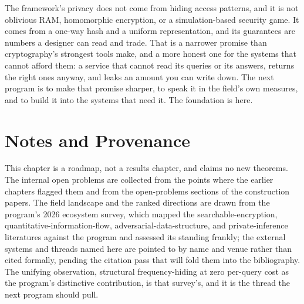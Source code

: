 The framework's privacy does not come from hiding access patterns, and it is
not oblivious RAM, homomorphic encryption, or a simulation-based security
game. It comes from a one-way hash and a uniform representation, and its
guarantees are numbers a designer can read and trade. That is a narrower
promise than cryptography's strongest tools make, and a more honest one for
the systems that cannot afford them: a service that cannot read its queries
or its answers, returns the right ones anyway, and leaks an amount you can
write down. The next program is to make that promise sharper, to speak it in
the field's own measures, and to build it into the systems that need it. The
foundation is here.

\section{Notes and Provenance}
\label{sec:ch14-notes}

This chapter is a roadmap, not a results chapter, and claims no new theorems.
The internal open problems are collected from the points where the earlier
chapters flagged them and from the open-problems sections of the construction
papers. The field landscape and the ranked directions are drawn from the
program's 2026 ecosystem survey, which mapped the searchable-encryption,
quantitative-information-flow, adversarial-data-structure, and
private-inference literatures against the program and assessed its standing
frankly; the external systems and threads named here are pointed to by name
and venue rather than cited formally, pending the citation pass that will
fold them into the bibliography. The unifying observation, structural
frequency-hiding at zero per-query cost as the program's distinctive
contribution, is that survey's, and it is the thread the next program should
pull.
